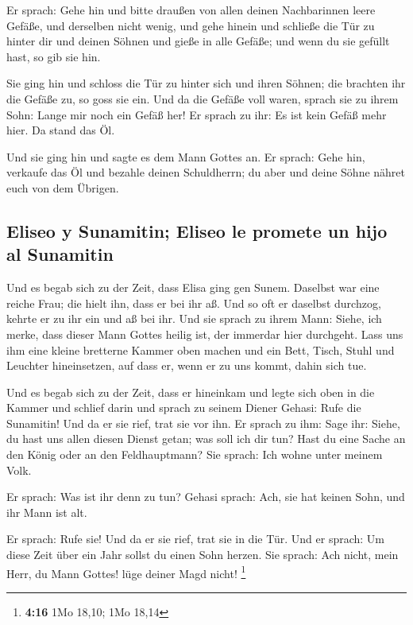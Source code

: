  Er sprach: Gehe hin und bitte draußen von allen deinen
Nachbarinnen leere Gefäße, und derselben nicht wenig,  und
gehe hinein und schließe die Tür zu hinter dir und deinen Söhnen und
gieße in alle Gefäße; und wenn du sie gefüllt hast, so gib sie hin.

 Sie ging hin und schloss die Tür zu hinter sich und ihren
Söhnen; die brachten ihr die Gefäße zu, so goss sie ein. 
Und da die Gefäße voll waren, sprach sie zu ihrem Sohn: Lange mir noch
ein Gefäß her! Er sprach zu ihr: Es ist kein Gefäß mehr hier. Da stand
das Öl.

 Und sie ging hin und sagte es dem Mann Gottes an. Er
sprach: Gehe hin, verkaufe das Öl und bezahle deinen Schuldherrn; du
aber und deine Söhne nähret euch von dem Übrigen.

\hypertarget{eliseo-y-sunamitin-eliseo-le-promete-un-hijo-al-sunamitin}{%
\subsection{Eliseo y Sunamitin; Eliseo le promete un hijo al
Sunamitin}\label{eliseo-y-sunamitin-eliseo-le-promete-un-hijo-al-sunamitin}}

 Und es begab sich zu der Zeit, dass Elisa ging gen Sunem.
Daselbst war eine reiche Frau; die hielt ihn, dass er bei ihr aß. Und so
oft er daselbst durchzog, kehrte er zu ihr ein und aß bei ihr.
 Und sie sprach zu ihrem Mann: Siehe, ich merke, dass
dieser Mann Gottes heilig ist, der immerdar hier durchgeht.
 Lass uns ihm eine kleine bretterne Kammer oben machen
und ein Bett, Tisch, Stuhl und Leuchter hineinsetzen, auf dass er, wenn
er zu uns kommt, dahin sich tue.

 Und es begab sich zu der Zeit, dass er hineinkam und
legte sich oben in die Kammer und schlief darin  und
sprach zu seinem Diener Gehasi: Rufe die Sunamitin! Und da er sie rief,
trat sie vor ihn.  Er sprach zu ihm: Sage ihr: Siehe, du
hast uns allen diesen Dienst getan; was soll ich dir tun? Hast du eine
Sache an den König oder an den Feldhauptmann? Sie sprach: Ich wohne
unter meinem Volk.

 Er sprach: Was ist ihr denn zu tun? Gehasi sprach: Ach,
sie hat keinen Sohn, und ihr Mann ist alt.

 Er sprach: Rufe sie! Und da er sie rief, trat sie in die
Tür.  Und er sprach: Um diese Zeit über ein Jahr sollst
du einen Sohn herzen. Sie sprach: Ach nicht, mein Herr, du Mann Gottes!
lüge deiner Magd nicht! \footnote{\textbf{4:16} 1Mo 18,10; 1Mo 18,14}

